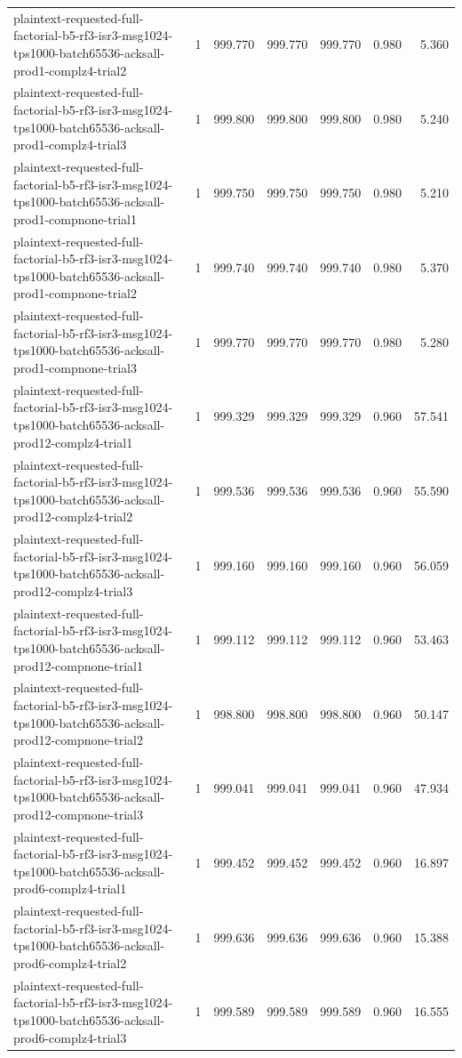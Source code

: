 \begin{tabular}{lrrrrrr}
plaintext-requested-full-factorial-b5-rf3-isr3-msg1024-tps1000-batch65536-acksall-prod1-complz4-trial2 & 1 & 999.770 & 999.770 & 999.770 & 0.980 & 5.360 \\
plaintext-requested-full-factorial-b5-rf3-isr3-msg1024-tps1000-batch65536-acksall-prod1-complz4-trial3 & 1 & 999.800 & 999.800 & 999.800 & 0.980 & 5.240 \\
plaintext-requested-full-factorial-b5-rf3-isr3-msg1024-tps1000-batch65536-acksall-prod1-compnone-trial1 & 1 & 999.750 & 999.750 & 999.750 & 0.980 & 5.210 \\
plaintext-requested-full-factorial-b5-rf3-isr3-msg1024-tps1000-batch65536-acksall-prod1-compnone-trial2 & 1 & 999.740 & 999.740 & 999.740 & 0.980 & 5.370 \\
plaintext-requested-full-factorial-b5-rf3-isr3-msg1024-tps1000-batch65536-acksall-prod1-compnone-trial3 & 1 & 999.770 & 999.770 & 999.770 & 0.980 & 5.280 \\
plaintext-requested-full-factorial-b5-rf3-isr3-msg1024-tps1000-batch65536-acksall-prod12-complz4-trial1 & 1 & 999.329 & 999.329 & 999.329 & 0.960 & 57.541 \\
plaintext-requested-full-factorial-b5-rf3-isr3-msg1024-tps1000-batch65536-acksall-prod12-complz4-trial2 & 1 & 999.536 & 999.536 & 999.536 & 0.960 & 55.590 \\
plaintext-requested-full-factorial-b5-rf3-isr3-msg1024-tps1000-batch65536-acksall-prod12-complz4-trial3 & 1 & 999.160 & 999.160 & 999.160 & 0.960 & 56.059 \\
plaintext-requested-full-factorial-b5-rf3-isr3-msg1024-tps1000-batch65536-acksall-prod12-compnone-trial1 & 1 & 999.112 & 999.112 & 999.112 & 0.960 & 53.463 \\
plaintext-requested-full-factorial-b5-rf3-isr3-msg1024-tps1000-batch65536-acksall-prod12-compnone-trial2 & 1 & 998.800 & 998.800 & 998.800 & 0.960 & 50.147 \\
plaintext-requested-full-factorial-b5-rf3-isr3-msg1024-tps1000-batch65536-acksall-prod12-compnone-trial3 & 1 & 999.041 & 999.041 & 999.041 & 0.960 & 47.934 \\
plaintext-requested-full-factorial-b5-rf3-isr3-msg1024-tps1000-batch65536-acksall-prod6-complz4-trial1 & 1 & 999.452 & 999.452 & 999.452 & 0.960 & 16.897 \\
plaintext-requested-full-factorial-b5-rf3-isr3-msg1024-tps1000-batch65536-acksall-prod6-complz4-trial2 & 1 & 999.636 & 999.636 & 999.636 & 0.960 & 15.388 \\
plaintext-requested-full-factorial-b5-rf3-isr3-msg1024-tps1000-batch65536-acksall-prod6-complz4-trial3 & 1 & 999.589 & 999.589 & 999.589 & 0.960 & 16.555 \\

\end{tabular}
